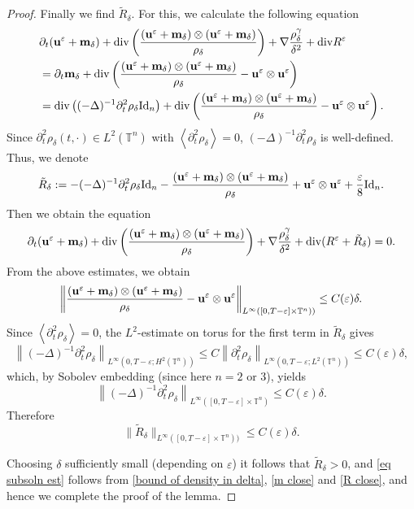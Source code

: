 \documentclass[12pt,reqno]{amsart}
\theoremstyle{definition}
\theoremstyle{remark}
\numberwithin{equation}{section}
\renewcommand{\u}{{\bf u}}
\newcommand{\Dv}{{\rm div}}
\newcommand{\T}{{\mathbb T}}
\newcommand{\id}{\mathrm{Id}}
\newcommand{\m}{{\bf m}}
\newcommand{\eps}{{\varepsilon}}
\begin{document}
\begin{proof}
Finally we find $\tilde{R}_{\delta}$. For this, we calculate the following equation
\begin{equation*}
\begin{split}
&\partial_t(\u^{\varepsilon} + \m_{\delta}) + \Dv \left( \frac{(\u^{\varepsilon}+ \m_{\delta})\otimes (\u^{\varepsilon}+ \m_{\delta})} {\rho_{\delta}} \right)+\nabla\frac{\rho_{\delta}^{\gamma}}{\delta^2}+\Dv R^{\varepsilon}
\\&=\partial_t \m_{\delta}+ \Dv \left( \frac{(\u^{\varepsilon} + \m_{\delta})\otimes (\u^{\varepsilon}+ \m_{\delta})} {\rho_{\delta}}-\u^{\varepsilon}\otimes\u^{\varepsilon} \right)
\\&= \Dv \left( (-\Delta)^{-1}\partial^2_{t}\rho_{\delta} \id_n \right)+\Dv \left( \frac{(\u^{\varepsilon}+ \m_{\delta})\otimes (\u^{\varepsilon}+\m_{\delta})} {\rho_{\delta}}-\u^{\varepsilon}\otimes\u^{\varepsilon} \right).
\end{split}
\end{equation*}
Since $\partial_t^2 \rho_\delta(t, \cdot) \in L^2(\T^n)$ with $\left\langle \partial_t^2 \rho_\delta \right\rangle = 0$, $(-\Delta)^{-1}\partial^2_{t}\rho_{\delta}$ is well-defined. 
Thus, we denote  
$$
\tilde{R}_{\delta} := -(-\Delta)^{-1}\partial^2_{t}\rho_{\delta} \id_n - \frac{(\u^{\varepsilon}+ \m_{\delta})\otimes (\u^{\varepsilon}+\m_{\delta})} {\rho_{\delta}}+\u^{\varepsilon}\otimes\u^{\varepsilon}+\frac{\varepsilon}{8} \id_n.
$$
Then we obtain the equation
\begin{equation*}
\partial_t(\u^{\varepsilon}+ \m_{\delta}) + \Dv \left( \frac{(\u^{\varepsilon}+ \m_{\delta})\otimes (\u^{\varepsilon}+ \m_{\delta})} {\rho_{\delta}} \right)+\nabla\frac{\rho_{\delta}^{\gamma}}{\delta^2}+\Dv (R^{\varepsilon}+\tilde{R}_{\delta})=0.
\end{equation*}
From the above estimates, we obtain 
\[
\left\| \frac{(\u^{\varepsilon}+ \m_{\delta})\otimes (\u^{\varepsilon}+\m_{\delta})} {\rho_{\delta}} - \u^{\varepsilon}\otimes\u^{\varepsilon} \right\|_{L^\infty([0,T-\varepsilon] \times \mathbb{T}^n))} \le C(\varepsilon) \delta.
\]
Since $\left\langle \partial_t^2 \rho_\delta \right\rangle = 0$, the $L^2$-estimate on torus for the first term in $\tilde{R}_{\delta}$ gives
\[
\left\| (-\Delta)^{-1} \partial_t^2 \rho_\delta \right\|_{L^\infty(0,T-\varepsilon; H^2(\mathbb{T}^n))} \le C \left\| \partial_t^2 \rho_\delta \right\|_{L^\infty(0,T-\varepsilon; L^2(\mathbb{T}^n))} \le C(\varepsilon) \delta,
\]
which, by Sobolev embedding (since here $n = 2$ or $3$), yields
\[
\left\| (-\Delta)^{-1} \partial_t^2 \rho_\delta \right\|_{L^\infty([0,T-\varepsilon] \times \mathbb{T}^n)} \le C(\varepsilon) \delta.
\]
Therefore
\begin{equation}\label{R close}
\| \tilde{R}_{\delta} \|_{L^\infty([0,T-\varepsilon] \times \mathbb{T}^n))} \leq C(\varepsilon) \delta.
\end{equation}

Choosing $\delta$ sufficiently small (depending on $\eps$) it follows that $\tilde{R}_{\delta} > 0$, and \eqref{eq subsoln est} follows from \eqref{bound of density in delta}, \eqref{m close} and \eqref{R close}, and hence we complete the proof of the lemma. 
\end{proof}
\end{document}
